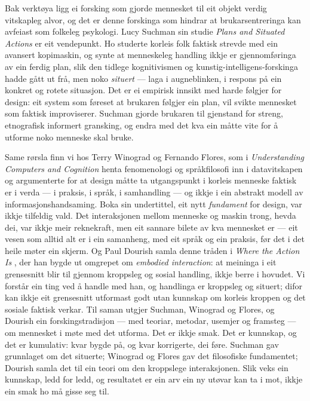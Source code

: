 Bak verktøya ligg ei forsking som gjorde mennesket til eit objekt verdig vitskapleg alvor, og det er denne forskinga som hindrar at brukarsentreringa kan avfeiast som folkeleg psykologi. Lucy Suchman sin studie \emph{Plans and Situated Actions} \autocite{suchman1987} er eit vendepunkt. Ho studerte korleis folk faktisk strevde med ein avansert kopimaskin, og synte at menneskeleg handling ikkje er gjennomføringa av ein ferdig plan, slik den tidlege kognitivismen og kunstig-intelligens-forskinga hadde gått ut frå, men noko \emph{situert} — laga i augneblinken, i respons på ein konkret og rotete situasjon. Det er ei empirisk innsikt med harde følgjer for design: eit system som føreset at brukaren følgjer ein plan, vil svikte mennesket som faktisk improviserer. Suchman gjorde brukaren til gjenstand for streng, etnografisk informert gransking, og endra med det kva ein måtte vite for å utforme noko menneske skal bruke.

Same rørsla finn vi hos Terry Winograd og Fernando Flores, som i \emph{Understanding Computers and Cognition} \autocite{winograd1986} henta fenomenologi og språkfilosofi inn i datavitskapen og argumenterte for at design måtte ta utgangspunkt i korleis menneske faktisk er i verda — i praksis, i språk, i samhandling — og ikkje i ein abstrakt modell av informasjonshandsaming. Boka sin undertittel, eit nytt \emph{fundament} for design, var ikkje tilfeldig vald. Det interaksjonen mellom menneske og maskin trong, hevda dei, var ikkje meir reknekraft, men eit sannare bilete av kva mennesket er — eit vesen som alltid alt er i ein samanheng, med eit språk og ein praksis, før det i det heile møter ein skjerm. Og Paul Dourish samla denne tråden i \emph{Where the Action Is} \autocite{dourish2001}, der han bygde ut omgrepet om \emph{embodied interaction}: at meininga i eit grensesnitt blir til gjennom kroppsleg og sosial handling, ikkje berre i hovudet. Vi forstår ein ting ved å handle med han, og handlinga er kroppsleg og situert; difor kan ikkje eit grensesnitt utformast godt utan kunnskap om korleis kroppen og det sosiale faktisk verkar. Til saman utgjer Suchman, Winograd og Flores, og Dourish ein forskingstradisjon — med teoriar, metodar, usemjer og framsteg — om mennesket i møte med det utforma. Det er ikkje smak. Det er kunnskap, og det er kumulativ: kvar bygde på, og kvar korrigerte, dei føre. Suchman gav grunnlaget om det situerte; Winograd og Flores gav det filosofiske fundamentet; Dourish samla det til ein teori om den kroppslege interaksjonen. Slik veks ein kunnskap, ledd for ledd, og resultatet er ein arv ein ny utøvar kan ta i mot, ikkje ein smak ho må gisse seg til.

